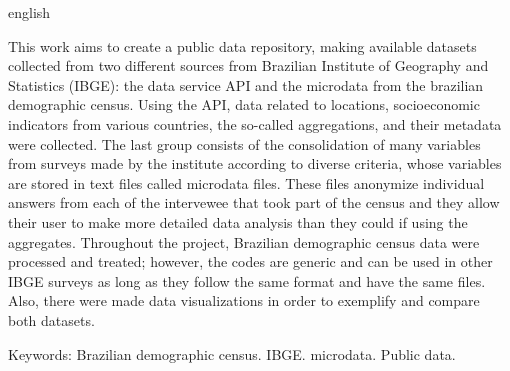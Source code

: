 \begin{resumo}[Abstract]
 \begin{otherlanguage*}{english}

This work aims to create a public data repository, making available datasets collected from two different sources from Brazilian Institute of Geography and Statistics (IBGE): the data service API and the microdata from the brazilian demographic census. Using the API, data related to locations, socioeconomic indicators from various countries, the so-called aggregations, and their metadata were collected. The last group consists of the consolidation of many variables from surveys made by the institute according to diverse criteria, whose variables are stored in text files called microdata files. These files anonymize individual answers from each of the intervewee that took part of the census and they allow their user to make more detailed data analysis than they could if using the aggregates. Throughout the project, Brazilian demographic census data were processed and treated; however, the codes are generic and can be used in other IBGE surveys as long as they follow the same format and have the same files. Also, there were made data visualizations in order to exemplify and compare both datasets.


 \end{otherlanguage*}

 Keywords: Brazilian demographic census. IBGE. microdata. Public data.
\end{resumo}